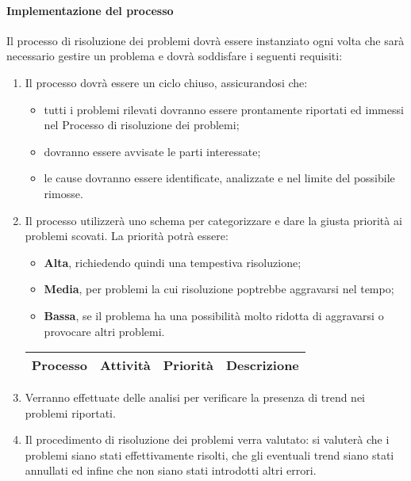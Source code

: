 		\paragraph{Implementazione del processo}
			Il processo di risoluzione dei problemi dovrà essere instanziato ogni volta che sarà necessario gestire un problema e dovrà soddisfare i seguenti requisiti:
			\begin{enumerate}
				\item Il processo dovrà essere un ciclo chiuso, assicurandosi che:
					\begin{itemize}
				 		\item tutti i problemi rilevati dovranno essere prontamente riportati ed immessi nel Processo di risoluzione dei problemi;
					 	\item dovranno essere avvisate le parti interessate;
				 		\item le cause dovranno essere identificate, analizzate e nel limite del possibile rimosse.
					 \end{itemize}  
				
				\item Il processo utilizzerà uno schema per categorizzare e dare la giusta priorità ai problemi scovati. La priorità potrà essere:
					\begin{itemize}
					 	\item \textbf{Alta}, richiedendo quindi una tempestiva risoluzione;
					 	\item \textbf{Media}, per problemi la cui risoluzione poptrebbe aggravarsi nel tempo;
					 	\item \textbf{Bassa}, se il problema ha una possibilità molto ridotta di aggravarsi o provocare altri problemi.
					 \end{itemize} 

					\begin{center}
						\begin{longtable}{|c|c|c|c|}
							\hline
							\rowcolor{lighter-grayer}
							\textbf{Processo} & \textbf{Attività} & \textbf{Priorità} & \textbf{Descrizione}\\
							\hline
							\endfirsthead
							\hline
							\hline
						\end{longtable}
					\end{center}

				\item Verranno effettuate delle analisi per verificare la presenza di trend nei problemi riportati.

				\item Il procedimento di risoluzione dei problemi verra valutato: si valuterà che i problemi siano stati effettivamente risolti, che gli eventuali trend siano stati annullati ed infine che non siano stati introdotti altri errori.
			\end{enumerate}	
